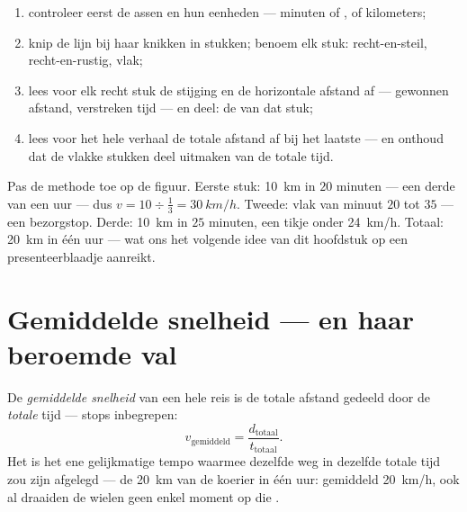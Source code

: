 \begin{method}\label{met:g7:motion-average-speed:read}
\begin{enumerate}
  \item controleer eerst de assen en hun eenheden --- minuten of
        ,  of kilometers;
  \item knip de lijn bij haar knikken in stukken; benoem elk stuk:
        recht-en-steil, recht-en-rustig, vlak;
  \item lees voor elk recht stuk de stijging en de horizontale
        afstand af --- gewonnen afstand, verstreken tijd --- en deel:
        de  van dat stuk;
  \item lees voor het hele verhaal de totale afstand af bij het
        laatste  --- en onthoud dat de vlakke stukken deel
        uitmaken van de totale tijd.
\end{enumerate}
\end{method}

\begin{example}\label{ex:g7:motion-average-speed:decoded}
Pas de methode toe op de figuur. Eerste stuk: \qty{10}{km} in $20$
minuten --- een derde van een uur --- dus $v = 10 \div \tfrac{1}{3} =
\qty{30}{km/h}$. Tweede: vlak van minuut $20$ tot $35$ --- een
bezorgstop. Derde: \qty{10}{km} in $25$ minuten, een tikje onder
\qty{24}{km/h}. Totaal: \qty{20}{km} in één uur --- wat ons het
volgende idee van dit hoofdstuk op een presenteerblaadje aanreikt.
\end{example}

\section{Gemiddelde snelheid --- en haar beroemde val}

\begin{definition}\label{def:g7:motion-average-speed:average}
De \emph{gemiddelde snelheid} van een hele
reis is de totale afstand gedeeld door de \emph{totale} tijd --- stops
inbegrepen:
\[
v_{\text{gemiddeld}} = \frac{d_{\text{totaal}}}{t_{\text{totaal}}}.
\]
Het is het ene gelijkmatige tempo waarmee dezelfde weg in dezelfde
totale tijd zou zijn afgelegd --- de \qty{20}{km} van de koerier in één
uur: gemiddeld \qty{20}{km/h}, ook al draaiden de wielen geen enkel
moment op die .
\end{definition}

